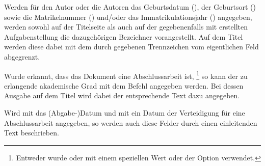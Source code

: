 \begin{Declaration*}{}
\begin{Declaration*}{}
\begin{Declaration*}{}
\begin{Declaration}{}
\begin{Declaration}{}
\begin{Declaration}{}
\begin{Declaration}{}
\printdeclarationlist%
%
%
%
Werden für den Autor oder die Autoren das Geburtsdatum (), 
der Geburtsort () sowie die
Matrikelnummer () und/oder das Immatrikulationsjahr 
() angegeben, werden sowohl auf der Titelseite als 
auch auf der gegebenenfalls mit  erstellten 
Aufgabenstellung die dazugehörigen Bezeichner vorangestellt. Auf dem Titel 
werden diese dabei mit dem durch  gegebenen Trennzeichen 
vom eigentlichen Feld abgegrenzt.
\end{Declaration}
\end{Declaration}
\end{Declaration}
\end{Declaration}

\begin{Declaration}[v2.02]{}
\printdeclarationlist%
%
%
%
Wurde erkannt, dass das Dokument eine Abschlussarbeit ist,%
\footnote{%
  Entweder wurde  oder  mit einem speziellen Wert 
  oder der Option  verwendet.
}
so kann der zu erlangende akademische Grad mit dem Befehl  
angegeben werden. Bei dessen Ausgabe auf dem Titel wird dabei der entsprechende 
Text dazu angegeben.
\end{Declaration}

\begin{Declaration}{}
\begin{Declaration}{}
\printdeclarationlist%
%
%
%
%
%
Wird mit  das (Abgabe-)Datum und mit  ein Datum 
der Verteidigung für eine Abschlussarbeit angegeben, so werden auch diese 
Felder durch einen einleitenden Text beschrieben.
\end{Declaration}
\end{Declaration}
%


\end{Declaration*}
\end{Declaration*}
\end{Declaration*}
